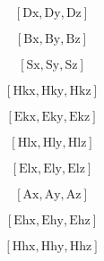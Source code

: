 \documentclass[fleqn]{article}
\begin{document}
\[\tag{D} 
\left[ \ensuremath{\mathrm{Dx}}\operatorname{,}\ensuremath{\mathrm{Dy}}\operatorname{,}\ensuremath{\mathrm{Dz}}\right] \mbox{}\]

\[\tag{B} 
\left[ \ensuremath{\mathrm{Bx}}\operatorname{,}\ensuremath{\mathrm{By}}\operatorname{,}\ensuremath{\mathrm{Bz}}\right] \mbox{}\]

\[\tag{S} 
\left[ \ensuremath{\mathrm{Sx}}\operatorname{,}\ensuremath{\mathrm{Sy}}\operatorname{,}\ensuremath{\mathrm{Sz}}\right] \mbox{}\]

\[\tag{Hk} 
\left[ \ensuremath{\mathrm{Hkx}}\operatorname{,}\ensuremath{\mathrm{Hky}}\operatorname{,}\ensuremath{\mathrm{Hkz}}\right] \mbox{}\]

\[\tag{Ek} 
\left[ \ensuremath{\mathrm{Ekx}}\operatorname{,}\ensuremath{\mathrm{Eky}}\operatorname{,}\ensuremath{\mathrm{Ekz}}\right] \mbox{}\]

\[\tag{Hl} 
\left[ \ensuremath{\mathrm{Hlx}}\operatorname{,}\ensuremath{\mathrm{Hly}}\operatorname{,}\ensuremath{\mathrm{Hlz}}\right] \mbox{}\]

\[\tag{El} 
\left[ \ensuremath{\mathrm{Elx}}\operatorname{,}\ensuremath{\mathrm{Ely}}\operatorname{,}\ensuremath{\mathrm{Elz}}\right] \mbox{}\]

\[\tag{A} 
\left[ \ensuremath{\mathrm{Ax}}\operatorname{,}\ensuremath{\mathrm{Ay}}\operatorname{,}\ensuremath{\mathrm{Az}}\right] \mbox{}\]

\[\tag{E\_ hat} 
\left[ \ensuremath{\mathrm{Ehx}}\operatorname{,}\ensuremath{\mathrm{Ehy}}\operatorname{,}\ensuremath{\mathrm{Ehz}}\right] \mbox{}\]

\[\tag{H\_ hat} 
\left[ \ensuremath{\mathrm{Hhx}}\operatorname{,}\ensuremath{\mathrm{Hhy}}\operatorname{,}\ensuremath{\mathrm{Hhz}}\right] \mbox{}
\]
\end{document}
